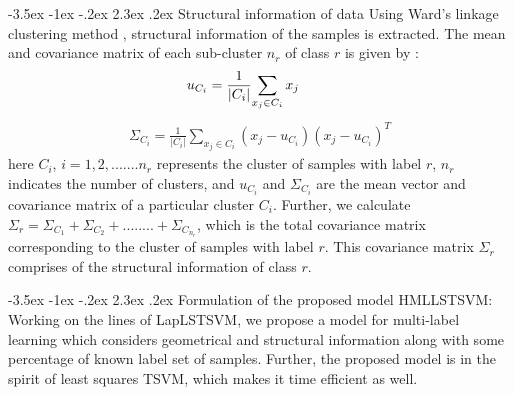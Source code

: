 \documentclass[12pt,a4paper,oneside,english]{report}
\makeatletter
\renewcommand\section{\@startsection {section}{1}{\z@}%
                                   {-3.5ex \@plus -1ex \@minus -.2ex}%
                                   {2.3ex \@plus.2ex}%
                                   {\centering\normalfont\LARGE\bfseries}}
\makeatother
\begin{document}
\section{Structural information of data}
 Using Ward's linkage clustering method \cite{hanifelou2018knn}, structural information of the samples is extracted. The mean and covariance matrix of each sub-cluster $n_r$ of class $r$ is given by :
\begin{eqnarray}
 &\hspace{-5mm} u_{C_i}= \frac{1}{|C_i|}{\displaystyle\sum_{x_j \in C_i}x_j}  \label{qpp10}
 \end{eqnarray}  
\begin{eqnarray}
\Sigma_{C_i} = \frac{1}{|C_i|}\sum_{x_j \in C_i}\left(x_j-u_{C_i}\right){\left(x_j-u_{C_i}\right)}^T
 \end{eqnarray}     \label{qpp11} 
here $C_i$, $i=1,2,.......n_r$ represents the cluster of samples with label $r$, $n_r$ indicates the number of clusters, and $u_{C_i}$  and ${\Sigma}_{C_i}$ are the mean vector and covariance matrix of a particular cluster $C_i$. Further, we calculate $\displaystyle{\Sigma_{r}= {\Sigma}_{C_1} + {\Sigma}_{C_2} + ........ + {\Sigma}_{C_{n_r}}}$, which is the total covariance matrix corresponding to the cluster of samples with label $r$. This covariance matrix $\Sigma_{r}$ comprises of the structural information of class $r$.





\section{Formulation of the proposed model HMLLSTSVM:}
Working on the lines of LapLSTSVM, we propose a model for multi-label learning which considers geometrical and structural information along with some percentage of known label set of samples. Further, the proposed model is in the spirit of least squares TSVM, which makes it time efficient as well.
\end{document}
